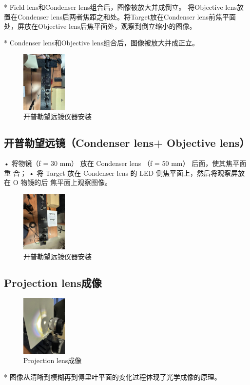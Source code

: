 \documentclass{ctexart}
\begin{document}
* Field lens和Condenser lens组合后，图像被放大并成倒立。
将Objective lens放置在Condenser lens后两者焦距之和处。将Target放在Condenser lens前焦平面处，屏放在Objective lens后焦平面处，观察到倒立缩小的图像。

* Condenser lens和Objective lens组合后，图像被放大并成正立。
\begin{figure}[htbp]
  \centering
  \includegraphics[width=0.2\textwidth,height=0.3\textwidth]{pictures/微信图片_20241010200924.jpg}
  \caption{开普勒望远镜仪器安装}
\end{figure} 

\subsection{开普勒望远镜（Condenser lens+ Objective lens）}
• 将物镜（f = 30 mm） 放在 Condenser lens （f = 50 mm） 后面，使其焦平面重
合；
• 将 Target 放在 Condenser lens 的 LED 侧焦平面上，然后将观察屏放在 O 物镜的后
焦平面上观察图像。
\begin{figure}[htbp]
  \centering
  \includegraphics[width=0.2\textwidth,height=0.3\textwidth]{pictures/微信图片_20241010200942.jpg}
  \caption{开普勒望远镜仪器安装}
\end{figure} 
\subsection{Projection lens成像}
\begin{figure}[htbp]
  \centering
  \includegraphics[width=0.2\textwidth,height=0.3\textwidth]{pictures/微信图片_20241010200955.jpg}
  \caption{Projection lens成像}
\end{figure} 
* 图像从清晰到模糊再到傅里叶平面的变化过程体现了光学成像的原理。
\end{document}

